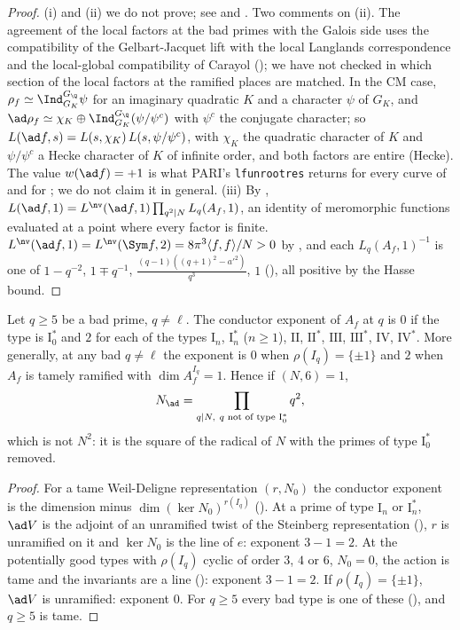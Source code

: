 \begin{proof}
(i) and (ii) we do not prove; see \cite{Shimura75} and \cite{GelbartJacquet}. Two comments on (ii). The agreement of the local factors at the bad primes with the
Galois side uses the compatibility of the Gelbart-Jacquet lift with the local Langlands correspondence and the local-global compatibility of Carayol
(); we have not checked in which section of \cite{GelbartJacquet} the local factors at the ramified places are matched. In the CM case,
$\rho_f\simeq\Ind_{G_K}^{G_\Q}\psi$ for an imaginary quadratic $K$ and a character $\psi$ of $G_K$, and $\ad\rho_f\simeq\chi_K\oplus\Ind_{G_K}^{G_\Q}(\psi/\psi^c)$ with $\psi^c$ the conjugate
character; so $L(\ad f,s)=L(s,\chi_K)\,L(s,\psi/\psi^c)$, with $\chi_K$ the quadratic character of $K$ and $\psi/\psi^c$ a Hecke character of $K$ of infinite order, and both
factors are entire (Hecke). The value $w(\ad f)=+1$ is what PARI's \texttt{lfunrootres} returns for every curve of  and for ; we do not
claim it in general.
(iii) By , $L(\ad f,1)=L^{\nv}(\ad f,1)\prod_{q^2\mid N}L_q(A_f,1)$, an identity of meromorphic functions evaluated at a point where every factor is
finite. $L^{\nv}(\ad f,1)=L^{\nv}(\Sym f,2)=8\pi^3\langle f,f\rangle/N>0$ by , and each $L_q(A_f,1)^{-1}$ is one of $1-q^{-2}$, $1\mp q^{-1}$,
$\frac{(q-1)((q+1)^2-a'^2)}{q^3}$, $1$ (), all positive by the Hasse bound.
\end{proof}

\begin{proposition}\label{prop:lfunctions:ad-conductor}
Let $q\ge5$ be a bad prime, $q\ne\ell$. The conductor exponent of $A_f$ at $q$ is $0$ if the type is $\mathrm I_0^*$ and $2$ for each of the types $\mathrm I_n$, $\mathrm I_n^*$ ($n\ge1$),
$\mathrm{II}$, $\mathrm{II}^*$, $\mathrm{III}$, $\mathrm{III}^*$, $\mathrm{IV}$, $\mathrm{IV}^*$. More generally, at any bad $q\ne\ell$ the exponent is $0$ when $\rho(I_q)=\{\pm1\}$ and $2$ when $A_f$ is tamely
ramified with $\dim A_f^{I_q}=1$. Hence if $(N,6)=1$,
\[
N_{\ad}=\prod_{q\mid N,\ q\text{ not of type }\mathrm I_0^*}q^2,
\]
which is not $N^2$: it is the square of the radical of $N$ with the primes of type $\mathrm I_0^*$ removed.
\end{proposition}

\begin{proof}
For a tame Weil-Deligne representation $(r,N_0)$ the conductor exponent is the dimension minus $\dim(\ker N_0)^{r(I_q)}$ (). At a prime of type $\mathrm I_n$ or $\mathrm I_n^*$,
$\ad V$ is the adjoint of an unramified twist of the Steinberg representation (), $r$ is unramified on it and $\ker N_0$ is the line of
$e$: exponent $3-1=2$. At the potentially good types with $\rho(I_q)$ cyclic of order $3$, $4$ or $6$, $N_0=0$, the action is tame and the invariants are a line
(): exponent $3-1=2$. If $\rho(I_q)=\{\pm1\}$, $\ad V$ is unramified: exponent $0$. For $q\ge5$ every bad type is one of these
(), and $q\ge5$ is tame.
\end{proof}

